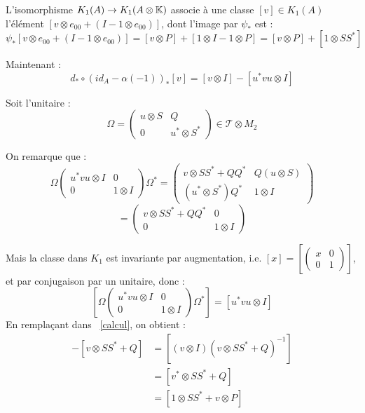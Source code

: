 \begin{dem}
L'isomorphisme $K_1(A)\rightarrow K_1(A\otimes\mathbb K)$ associe à une classe $[v]\in K_1(A)$ l'élément $[v\otimes e_{00}+(I-1\otimes e_{00})]$, dont l'image par $\psi_*$ est :
\begin{equation}\label{identite}\psi_*[v\otimes e_{00}+(I-1\otimes e_{00})]= [v\otimes P]+[1\otimes I-1\otimes P] = [v\otimes P]+[1\otimes SS^*]\end{equation}

Maintenant :
\begin{equation}\label{calcul}d_*\circ \left(id_A-\alpha(-1)\right)_*[v]= [ v\otimes I]-[ u^*vu\otimes I]\end{equation}

Soit l'unitaire :\quad\[\Omega = \begin{pmatrix}u\otimes S & Q \\ 0 & u^*\otimes S^*\end{pmatrix}\in \mathcal T \otimes M_2\]

On remarque que :
\[\Omega\begin{pmatrix}u^*vu\otimes I & 0 \\ 0 & 1\otimes I\end{pmatrix}\Omega^*= \begin{pmatrix}v\otimes SS^* +QQ^*& Q(u\otimes S) \\ (u^*\otimes S^*)Q^* & 1\otimes I\end{pmatrix}\]
\[=\begin{pmatrix}v\otimes SS^* +QQ^*& 0 \\ 0 & 1\otimes I\end{pmatrix}\]


Mais la classe dans $K_1$ est invariante par augmentation, i.e. $[x]=\left[\begin{pmatrix}x& 0 \\ 0 & 1\end{pmatrix}\right]$, et par conjugaison par un unitaire, donc :
\[\left[\Omega\begin{pmatrix}u^*vu\otimes I & 0 \\ 0 & 1\otimes I\end{pmatrix}\Omega^*\right]=\left[u^*vu\otimes I\right]\]
En remplaçant dans ~\eqref{calcul}, on obtient :
\begin{align*}
[ v\otimes I]-[v\otimes SS^* +Q]& =[( v\otimes I)(v\otimes SS^* +Q)^{-1}]\\\
&=[v^*\otimes SS^* +Q]\\
&=[1\otimes SS^* +v\otimes P]
\end{align*}


\end{dem}
